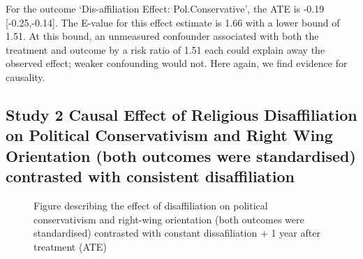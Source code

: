 \documentclass[
  singlecolumn]{article}
\begin{document}
For the outcome `Dis-affiliation Effect: Pol.Conservative', the ATE is
-0.19 {[}-0.25,-0.14{]}. The E-value for this effect estimate is 1.66
with a lower bound of 1.51. At this bound, an unmeasured confounder
associated with both the treatment and outcome by a risk ratio of 1.51
each could explain away the observed effect; weaker confounding would
not. Here again, we find evidence for causality.

\newpage{}

\subsection{Study 2 Causal Effect of Religious Disaffiliation on
Political Conservativism and Right Wing Orientation (both outcomes were
standardised) contrasted with consistent
disaffiliation}\label{study-2-causal-effect-of-religious-disaffiliation-on-political-conservativism-and-right-wing-orientation-both-outcomes-were-standardised-contrasted-with-consistent-disaffiliation}

\begin{figure}


\caption{\label{fig-contrast}Figure describing the effect of
disaffiliation on political conservativism and right-wing orientation
(both outcomes were standardised) contrasted with constant
dissafiliation + 1 year after treatment (ATE)}

\end{figure}%
\end{document}
